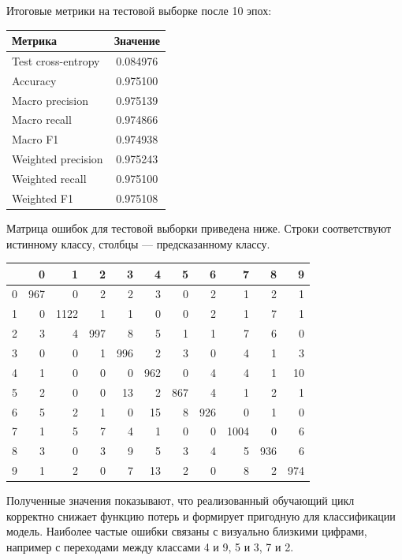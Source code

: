\documentclass{article}
\begin{document}
Итоговые метрики на тестовой выборке после 10 эпох:
\begin{center}
\begin{tabular}{|l|c|}
\hline
Метрика & Значение \\
\hline
Test cross-entropy & 0.084976 \\
Accuracy & 0.975100 \\
Macro precision & 0.975139 \\
Macro recall & 0.974866 \\
Macro F1 & 0.974938 \\
Weighted precision & 0.975243 \\
Weighted recall & 0.975100 \\
Weighted F1 & 0.975108 \\
\hline
\end{tabular}
\end{center}

Матрица ошибок для тестовой выборки приведена ниже. Строки
соответствуют истинному классу, столбцы --- предсказанному классу.
\begin{center}
\small
\begin{tabular}{c|rrrrrrrrrr}
 & 0 & 1 & 2 & 3 & 4 & 5 & 6 & 7 & 8 & 9 \\
\hline
0 & 967 & 0 & 2 & 2 & 3 & 0 & 2 & 1 & 2 & 1 \\
1 & 0 & 1122 & 1 & 1 & 0 & 0 & 2 & 1 & 7 & 1 \\
2 & 3 & 4 & 997 & 8 & 5 & 1 & 1 & 7 & 6 & 0 \\
3 & 0 & 0 & 1 & 996 & 2 & 3 & 0 & 4 & 1 & 3 \\
4 & 1 & 0 & 0 & 0 & 962 & 0 & 4 & 4 & 1 & 10 \\
5 & 2 & 0 & 0 & 13 & 2 & 867 & 4 & 1 & 2 & 1 \\
6 & 5 & 2 & 1 & 0 & 15 & 8 & 926 & 0 & 1 & 0 \\
7 & 1 & 5 & 7 & 4 & 1 & 0 & 0 & 1004 & 0 & 6 \\
8 & 3 & 0 & 3 & 9 & 5 & 3 & 4 & 5 & 936 & 6 \\
9 & 1 & 2 & 0 & 7 & 13 & 2 & 0 & 8 & 2 & 974 \\
\end{tabular}
\end{center}

Полученные значения показывают, что реализованный обучающий цикл
корректно снижает функцию потерь и формирует пригодную для
классификации модель. Наиболее частые ошибки связаны с визуально
близкими цифрами, например с переходами между классами 4 и 9, 5 и 3, 7
и 2.
\end{document}
